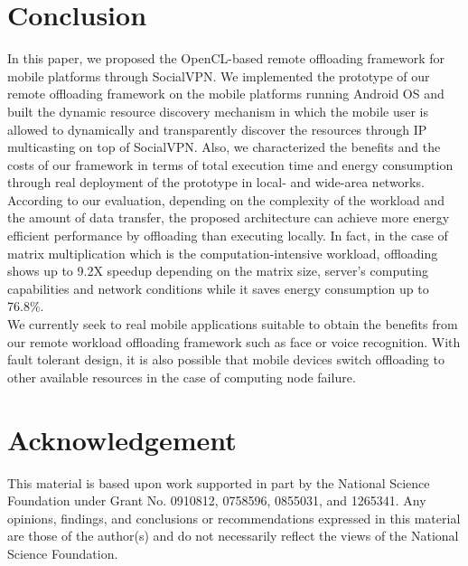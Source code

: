 \documentclass[10pt, conference, compsocconf]{IEEEtran}
\begin{document}
\section{Conclusion}
%
In this paper, we proposed the OpenCL-based remote offloading framework
for mobile platforms through SocialVPN.
%
We implemented the prototype of our remote offloading framework on the
mobile platforms running Android OS and built the dynamic resource
discovery mechanism in which the mobile user is allowed to dynamically
and transparently discover the resources through IP multicasting on top
of SocialVPN.
%
Also, we characterized the benefits and the costs of our framework in
terms of total execution time and energy consumption through real
deployment of the prototype in local- and wide-area networks.
%
According to our evaluation, depending on the complexity of the workload
and the amount of data transfer, the proposed architecture can achieve more
energy efficient performance by offloading than executing locally.
%
In fact, in the case of matrix multiplication which is the
computation-intensive workload, offloading shows up to 9.2X speedup
depending on the matrix size, server's computing capabilities and network
conditions while it saves energy consumption up to 76.8\%.\\
%
\indent We currently seek to real mobile applications suitable to obtain the
benefits from our remote workload offloading framework such as face or
voice recognition.
%
With fault tolerant design, it is also possible that mobile devices
switch offloading to other available resources in the case of computing
node failure.
%
\section*{Acknowledgement}
This material is based upon work supported in part by the National Science
Foundation under Grant No. 0910812, 0758596, 0855031, and 1265341.
%
Any opinions, findings, and conclusions or recommendations expressed in
this material are those of the author(s) and do not necessarily reflect
the views of the National Science Foundation.
%
%

\end{document}
